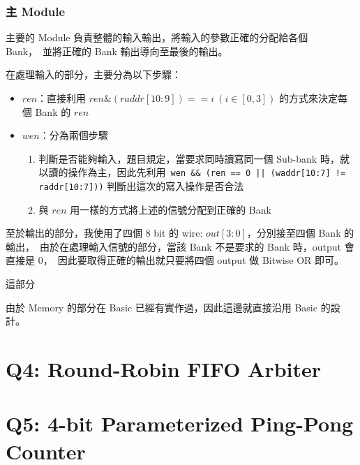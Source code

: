 \documentclass[10.5pt,compsoc,UTF8]{CjC}
\theoremstyle{mystyle}
\begin{document}
\subsubsection*{主 Module}
主要的 Module 負責整體的輸入輸出，將輸入的參數正確的分配給各個 Bank，\
並將正確的 Bank 輸出導向至最後的輸出。

在處理輸入的部分，主要分為以下步驟：
\begin{itemize}
  \item $ren$：直接利用 $ren \& (raddr[10:9]) == i\ (i \in [0, 3])$ 的方式來決定每個 Bank 的 $ren$
  \item $wen$：分為兩個步驟
  \begin{enumerate}
    \item 判斷是否能夠輸入，題目規定，當要求同時讀寫同一個 Sub-bank 時，就以讀的操作為主，因此先利用\
    \texttt{wen \&\& (ren == 0 || (waddr[10:7] != raddr[10:7]))} 判斷出這次的寫入操作是否合法
    \item 與 $ren$ 用一樣的方式將上述的信號分配到正確的 Bank
  \end{enumerate}
\end{itemize}

至於輸出的部分，我使用了四個 8 bit 的 wire: $out[3:0]$，分別接至四個 Bank 的輸出，\
由於在處理輸入信號的部分，當該 Bank 不是要求的 Bank 時，output 會直接是 $0$，\
因此要取得正確的輸出就只要將四個 output 做 Bitwise OR 即可。


這部分

由於 Memory 的部分在 Basic 已經有實作過，因此這邊就直接沿用 Basic 的設計。

\section{Q4: Round-Robin FIFO Arbiter}

\section{Q5: 4-bit Parameterized Ping-Pong Counter}
\end{document}
